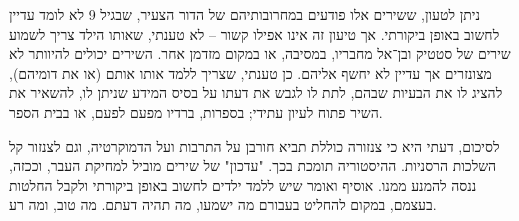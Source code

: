 \documentclass[12pt]{article}
\begin{document}
		ניתן לטעון, ששירים אלו פודעים במחרובותיהם של הדור הצעיר, שבגיל 9 לא לומד עדיין לחשוב באופן ביקורתי. אך טיעון זה אינו אפילו קשור – לא טענתי, שאותו הילד צריך לשמוע שירים של סטטיק ובן־אל מחבריו, במסיבה, או במקום מזדמן אחר. השירים יכולים להיוותר לא מצונזרים אך עדיין לא יחשף אליהם. כן טענתי, שצריך ללמד אותו אותם (או את דומיהם), להציג לו את הבעיות שבהם, לתת לו לגבש את דעתו על בסיס המידע שניתן לו, להשאיר את השיר פתוח לעיון עתידי; בספרות, ברדיו מפעם לפעם, או בבית הספר. 
		
		לסיכום, דעתי היא כי צנזורה כוללת תביא חורבן על התרבות ועל הדמוקרטיה, וגם לצנזור קל השלכות הרסניות. ההיסטוריה תומכת בכך. "עדכון" של שירים מוביל למחיקת העבר, וככזה, ננסה להמנע ממנו. אוסיף ואומר שיש ללמד ילדים לחשוב באופן ביקורתי ולקבל החלטות בעצמם, במקום להחליט בעבורם מה ישמעו, מה תהיה דעתם. מה טוב, ומה רע. 
	\hfill \blacksquare
	
	
\end{document}
